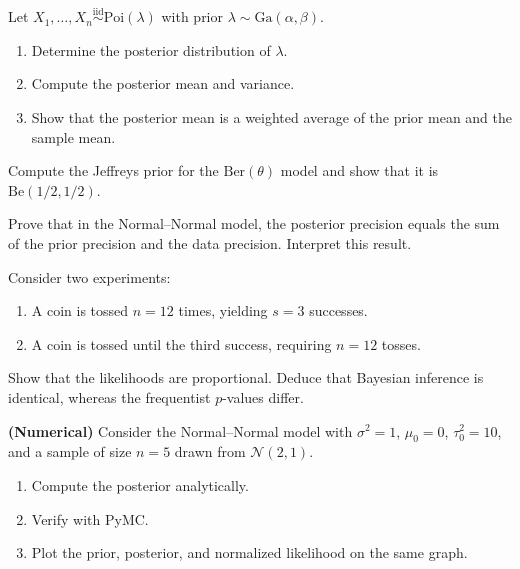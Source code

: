 \begin{exercise}
Let $X_1, \ldots, X_n \overset{\text{iid}}{\sim} \text{Poi}(\lambda)$
with prior $\lambda \sim \text{Ga}(\alpha, \beta)$.
\begin{enumerate}
  \item Determine the posterior distribution of $\lambda$.
  \item Compute the posterior mean and variance.
  \item Show that the posterior mean is a weighted average of the prior
        mean and the sample mean.
\end{enumerate}
\end{exercise}

\begin{exercise}
Compute the Jeffreys prior for the $\text{Ber}(\theta)$ model and show
that it is $\text{Be}(1/2, 1/2)$.
\end{exercise}

\begin{exercise}
Prove that in the Normal--Normal model, the posterior precision equals
the sum of the prior precision and the data precision. Interpret this
result.
\end{exercise}

\begin{exercise}
Consider two experiments:
\begin{enumerate}
  \item A coin is tossed $n = 12$ times, yielding $s = 3$ successes.
  \item A coin is tossed until the third success, requiring $n = 12$ tosses.
\end{enumerate}
Show that the likelihoods are proportional. Deduce that Bayesian
inference is identical, whereas the frequentist $p$-values differ.
\end{exercise}

\begin{exercise}
\textbf{(Numerical)} Consider the Normal--Normal model with
$\sigma^2 = 1$, $\mu_0 = 0$, $\tau_0^2 = 10$, and a sample of size
$n = 5$ drawn from $\mathcal{N}(2, 1)$.
\begin{enumerate}
  \item Compute the posterior analytically.
  \item Verify with PyMC.
  \item Plot the prior, posterior, and normalized likelihood on the
        same graph.
\end{enumerate}
\end{exercise}

